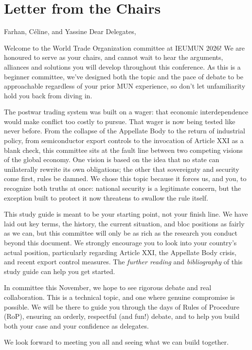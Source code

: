 \section{Letter from the Chairs}

\begin{chairletter}{Farhan, Céline, and Yassine}
Dear Delegates,

Welcome to the World Trade Organization committee at IEUMUN 2026! We are honoured to serve as your chairs, and cannot wait to hear the arguments, alliances and solutions you will develop throughout this conference. As this is a beginner committee, we've designed both the topic and the pace of debate to be approachable regardless of your prior MUN experience, so don't let unfamiliarity hold you back from diving in.

The postwar trading system was built on a wager: that economic interdependence would make conflict too costly to pursue. That wager is now being tested like never before. From the collapse of the Appellate Body to the return of industrial policy, from semiconductor export controls to the invocation of Article XXI as a blank check, this committee sits at the fault line between two competing visions of the global economy. One vision is based on the idea that no state can unilaterally rewrite its own obligations; the other that sovereignty and security come first, rules be damned. We chose this topic because it forces us, and you, to recognize both truths at once: national security is a legitimate concern, but the exception built to protect it now threatens to swallow the rule itself.

This study guide is meant to be your starting point, not your finish line. We have laid out key terms, the history, the current situation, and bloc positions as fairly as we can, but this committee will only be as rich as the research you conduct beyond this document. We strongly encourage you to look into your country’s actual position, particularly regarding Article XXI, the Appellate Body crisis, and recent export control measures. The \emph{further reading} and \emph{bibliography} of this study guide can help you get started.

In committee this November, we hope to see rigorous debate and real collaboration. This is a technical topic, and one where genuine compromise is possible. We will be there to guide you through the days of Rules of Procedure (RoP), ensuring an orderly, respectful (and fun!) debate, and to help you build both your case and your confidence as delegates.

We look forward to meeting you all and seeing what we can build together.

\end{chairletter}
